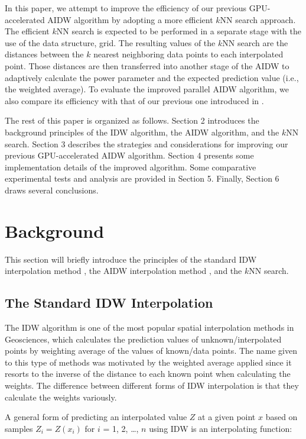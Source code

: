 \documentclass[final,5p,times,twocolumn,authoryear]{elsarticle}
\begin{document}
In this paper, we attempt to improve the efficiency of our previous 
GPU-accelerated AIDW algorithm by adopting a more efficient $k$NN search 
approach. The efficient $k$NN search is expected to be performed in a separate 
stage with the use of the data structure, grid. The resulting values of the 
$k$NN search are the distances between the $k$ nearest neighboring data points to 
each interpolated point. Those distances are then transferred into another 
stage of the AIDW to adaptively calculate the power parameter and the 
expected prediction value (i.e., the weighted average). To evaluate the 
improved parallel AIDW algorithm, we also compare its efficiency with that 
of our previous one introduced in \cite{29DBLP:journals/corr/MeiXX15}.

The rest of this paper is organized as follows. Section 2 introduces the 
background principles of the IDW algorithm, the AIDW algorithm, and the 
$k$NN search. Section 3 describes the strategies and considerations for 
improving our previous GPU-accelerated AIDW algorithm. Section 4 presents 
some implementation details of the improved algorithm. Some comparative 
experimental tests and analysis are provided in Section 5. Finally, Section 
6 draws several conclusions.

\section{Background}
This section will briefly introduce the principles of the standard IDW 
interpolation method \citep{01Shepard:1968:TIF:800186.810616}, the AIDW interpolation method 
\citep{28DBLP:journals/gandc/LuW08}, and the $k$NN search.

\subsection{The Standard IDW Interpolation}
The IDW algorithm is one of the most popular spatial interpolation methods 
in Geosciences, which calculates the prediction values of 
unknown/interpolated points by weighting average of the values of known/data 
points. The name given to this type of methods was motivated by the weighted 
average applied since it resorts to the inverse of the distance to each 
known point when calculating the weights. The difference between different 
forms of IDW interpolation is that they calculate the weights variously. 

A general form of predicting an interpolated value $Z$ at a given point $x$ based 
on samples $Z_{i}=Z(x_{i})$ for $i$ = 1, 2, {\ldots}, $n$ using IDW is an 
interpolating function: 
\end{document}
